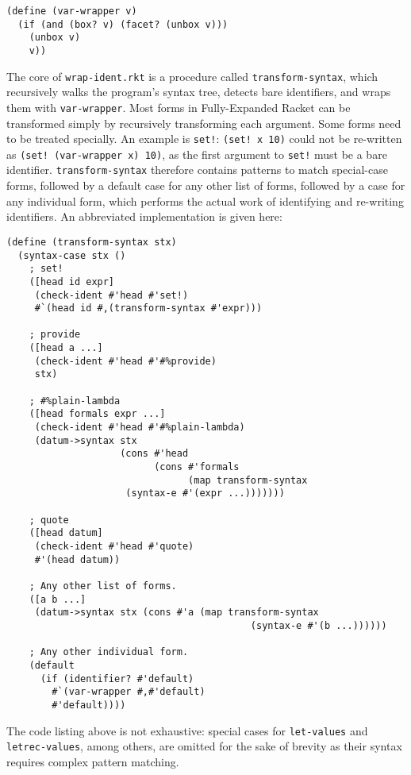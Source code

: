 \documentclass{article}
\begin{document}
\begin{lstlisting}
(define (var-wrapper v)
  (if (and (box? v) (facet? (unbox v)))
    (unbox v)
    v))
\end{lstlisting}

The core of \texttt{wrap-ident.rkt} is a procedure called \texttt{transform-syntax}, which recursively walks the program's syntax tree, detects bare identifiers, and wraps them with \texttt{var-wrapper}. Most forms in Fully-Expanded Racket can be transformed simply by recursively transforming each argument. Some forms need to be treated specially. An example is \texttt{set!}: \texttt{(set! x 10)} could not be re-written as \texttt{(set! (var-wrapper x) 10)}, as the first argument to \texttt{set!} must be a bare identifier. \texttt{transform-syntax} therefore contains patterns to match special-case forms, followed by a default case for any other list of forms, followed by a case for any individual form, which performs the actual work of identifying and re-writing identifiers. An abbreviated implementation is given here:

\begin{lstlisting}
(define (transform-syntax stx)
  (syntax-case stx ()
    ; set!
    ([head id expr]
     (check-ident #'head #'set!)
     #`(head id #,(transform-syntax #'expr)))

    ; provide
    ([head a ...]
     (check-ident #'head #'#%provide)
     stx)

    ; #%plain-lambda
    ([head formals expr ...]
     (check-ident #'head #'#%plain-lambda)
     (datum->syntax stx
                    (cons #'head
                          (cons #'formals
                                (map transform-syntax
				     (syntax-e #'(expr ...)))))))

    ; quote
    ([head datum]
     (check-ident #'head #'quote)
     #'(head datum))

    ; Any other list of forms.
    ([a b ...]
     (datum->syntax stx (cons #'a (map transform-syntax
                                           (syntax-e #'(b ...))))))

    ; Any other individual form.
    (default
      (if (identifier? #'default)
        #`(var-wrapper #,#'default)
        #'default))))
\end{lstlisting}

The code listing above is not exhaustive: special cases for \texttt{let-values} and \texttt{letrec-values}, among others, are omitted for the sake of brevity as their syntax requires complex pattern matching.
\end{document}
